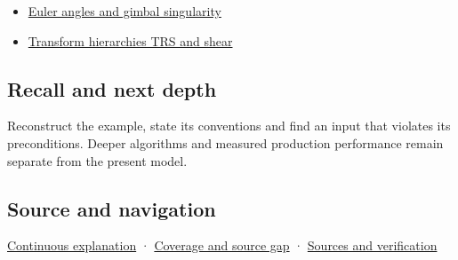 \hypertarget{appendix-26d8da71f6c4-used-by}{}

\begin{itemize}
\tightlist
\item
  \hyperref[appendix-5f723fbd0593]{Euler angles and gimbal singularity}
\item
  \hyperref[appendix-292c061cd47c]{Transform hierarchies TRS and shear}
\end{itemize}

\subsection{Recall and next depth}\label{appendix-26d8da71f6c4-recall-and-next-depth}

\hypertarget{appendix-26d8da71f6c4-recall-and-next-depth}{}

Reconstruct the example, state its conventions and find an input that violates its preconditions. Deeper algorithms and measured production performance remain separate from the present model.

\subsection{Source and navigation}\label{appendix-26d8da71f6c4-source-and-navigation}

\hypertarget{appendix-26d8da71f6c4-source-and-navigation}{}

\hyperref[01-foundations-i-ch018-keep-the-promises-visible-while-moving-between-representations]{Continuous explanation} · \hyperref[appendix-fd090d982a15-phase-7---parts-601-700]{Coverage and source gap} · \hyperref[appendix-a103e7846d21-phase-7---source-analysis-and-verification]{Sources and verification}
